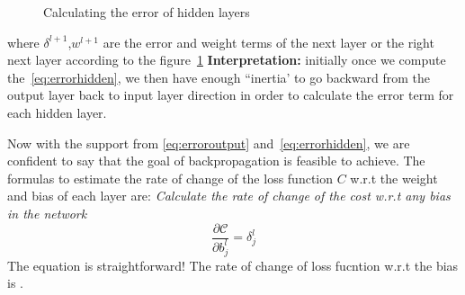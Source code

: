 \begin{figure}[H]
\centering
\caption{Calculating the error of hidden layers}
\label{fig:errorlayer}
\end{figure}
where $\delta^{l+1}$,$w^{l+1}$ are the error and weight terms of the next layer or the right next layer according to the figure~\ref{fig:errorlayer}\newline \noindent
\textbf{Interpretation:} initially once we compute the~\eqref{eq:errorhidden}, we then have enough ``inertia' to go backward from the output layer back to input layer direction in order to calculate the error term for each hidden layer.

\vspace{0.2cm} \noindent
Now with the support from \eqref{eq:erroroutput} and~\eqref{eq:errorhidden}, we are confident to say that the goal of backpropagation is feasible to achieve. The formulas to estimate the rate of change of the loss function $C$ w.r.t the weight and bias of each layer are:\newline \noindent
\newline \noindent
\textit{Calculate the rate of change of the cost w.r.t any bias in the network}
\begin{equation}\label{eq:errorbias}
    \frac{\partial \mathcal{C}}{\partial b^{l}_{j}} = \delta^{l}_{j}
\end{equation}
The equation is straightforward! The rate of change of loss fucntion w.r.t the bias is \underline{}.

